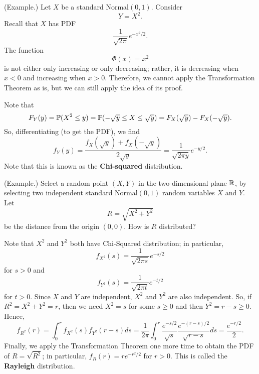\documentclass[letterpaper]{article}
\begin{document}
\begin{mdframed}[]
    (Example.) Let $X$ be a standard Normal$(0, 1)$. Consider \[Y = X^2.\] Recall that $X$ has PDF \[\frac{1}{\sqrt{2\pi}} e^{-x^2 / 2}.\] The function \[\Phi(x) = x^2\] is not either only increasing or only decreasing; rather, it is decreasing when $x < 0$ and increasing when $x > 0$. Therefore, we cannot apply the Transformation Theorem as is, but we can still apply the idea of its proof. 

    \bigskip 

    Note that \[F_{Y}(y) = \mathbb{P}(X^2 \leq y) = \mathbb{P}(-\sqrt{y} \leq X \leq \sqrt{y}) = F_{X}(\sqrt{y}) - F_{X}(-\sqrt{y}).\] So, differentiating (to get the PDF), we find \[f_{Y}(y) = \frac{f_{X}(\sqrt{y}) + f_{X}(-\sqrt{y})}{2\sqrt{y}} = \frac{1}{\sqrt{2\pi y}} e^{-y / 2}.\]
    Note that this is known as the \textbf{Chi-squared} distribution.
\end{mdframed}

\begin{mdframed}[]
    (Example.) Select a random point $(X, Y)$ in the two-dimensional plane $\mathbb{R}$, by selecting two independent standard Normal$(0, 1)$ random variables $X$ and $Y$. Let \[R = \sqrt{X^2 + Y^2}\] be the distance from the origin $(0, 0)$. How is $R$ distributed? 

    \bigskip 

    Note that $X^2$ and $Y^2$ both have Chi-Squared distribution; in particular,
    \[f_{X^2}(s) = \frac{1}{\sqrt{2\pi s}} e^{-s / 2}\]
    for $s > 0$ and 
    \[f_{Y^2}(s) = \frac{1}{\sqrt{2\pi t}} e^{-t / 2}\]
    for $t > 0$. Since $X$ and $Y$ are independent, $X^2$ and $Y^2$ are also independent. So, if $R^2 = X^2 + Y^2 = r$, then we need $X^2 = s$ for some $s \geq 0$ and then $Y^2 = r - s \geq 0$. Hence, 
    \[f_{R^2}(r) = \int_0^r f_{X^2}(s) f_{Y^2}(r - s) ds = \frac{1}{2\pi} \int_0^r \frac{e^{-s / 2}}{\sqrt{s}} \frac{e^{-(r - s) / 2}}{\sqrt{r - s}} ds = \frac{e^{-r / 2}}{2}.\]
    Finally, we apply the Transformation Theorem one more time to obtain the PDF of $R = \sqrt{R^2}$; in particular, $f_{R}(r) = re^{-r^2 / 2}$ for $r > 0$. This is called the \textbf{Rayleigh} distribution. 
\end{mdframed}
\end{document}
